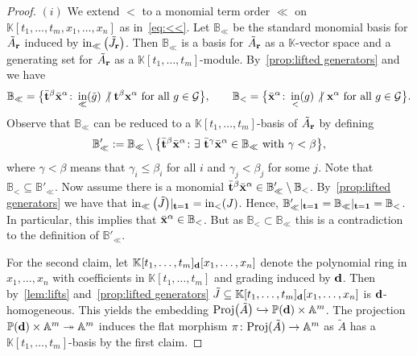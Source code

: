 \documentclass[10pt,a4paper]{amsart}
\newcommand{\thref}[1]{\ref{#1}}
\numberwithin{equation}{section}
\DeclareMathOperator{\init}{in}
\begin{document}
\begin{proof}
$(i)$ We extend $<$ to a monomial term order $\ll$ on $\mathbb K[t_1,\dots,t_m,x_1,\dots,x_n]$ as in~\eqref{eq:<<}.
 Let $\mathbb B_{\ll}$ be the standard monomial basis for $\tilde A_{\bf r}$ induced by $\init_{\ll}\big(\tilde J_{\bf r}\big)$.
 Then $\mathbb B_{\ll}$ is a basis for $\tilde A_{\bf r}$ as a $\mathbb{K}$-vector space and a generating set for $\tilde A_{\bf r}$ as a $\mathbb K[t_1,\dots,t_m]$-module.
 By~\thref{prop:lifted generators} and~\cite[Proposition 1.1.5]{herzog2011monomial} we have
 \begin{gather*}
 \mathbb B_{\ll} = \big\{\bar {\bf t}^\beta\bar {\bf x}^\alpha \colon \init_{\ll}(\tilde g)\not\vert \ {\bf t}^\beta{\bf x}^\alpha \text{ for all }g\in \mathcal G\big\},\qquad
 \mathbb B_{<} = \big\{\bar {\bf x}^\alpha \colon \init_{<}(g)\not\vert \ {\bf x}^\alpha \text{ for all }g\in \mathcal G\big\}.
 \end{gather*}
 Observe that $\mathbb B_{\ll}$ can be reduced to a $\mathbb K[t_1,\dots,t_m]$-basis of $\tilde A_{\bf r}$ by defining
 \begin{displaymath}
 \mathbb B'_{\ll}:= \mathbb B_{\ll} \setminus \big\{\bar{\bf t}^\beta\bar{\bf x}^\alpha \colon \exists \ \bar{\bf t}^{\gamma}\bar{\bf x}^\alpha\in \mathbb B_{\ll} \text{ with } \gamma < \beta\big\},
 \end{displaymath}
 where $\gamma < \beta$ means that $\gamma_i\le \beta_i$ for all $i$ and $\gamma_j<\beta_j$ for some $j$. Note that $\mathbb B_{<}\subseteq \mathbb B'_{\ll}$.
 Now assume there is a monomial $\bar{\bf t}^\beta\bar{\bf x}^\alpha \in \mathbb B'_{\ll}\setminus \mathbb B_<$.
 By~\thref{prop:lifted generators} we have that $\init_{\ll}\big(\tilde J\big)\vert_{{\bf t}={\bf 1}}=\init_<(J)$.
 Hence, $\mathbb B'_{\ll}\vert_{{\bf t}={\bf 1}}=\mathbb B_{\ll}\vert_{{\bf t}={\bf 1}}=\mathbb B_<$.
 In particular, this implies that $\bar{\bf x}^\alpha\in \mathbb B_<$. But as $\mathbb B_<\subset \mathbb B_{\ll}$ this is a contradiction to the definition of $\mathbb B'_{\ll}$.

 For the second claim, let $\mathbb K[t_1,\dots,t_m]_{\bf d}[x_1,\dots,x_n]$ denote the polynomial ring in $x_1,\dots,x_n$ with coefficients in $\mathbb K[t_1,\dots,t_m]$ and grading induced by ${\bf d}$.
 Then by~\thref{lem:lifts} and~\thref{prop:lifted generators} $\tilde J\subseteq \mathbb K[t_1,\dots,t_m]_{\bf d}[x_1,\dots,x_n]$ is ${\bf d}$-homogeneous.
 This yields the embedding ${\rm Proj}\big(\tilde A\big)\hookrightarrow \mathbb P({\bf d})\times \mathbb A^m$.
 The projection $\mathbb P({\bf d})\times \mathbb A^m\twoheadrightarrow \mathbb A^m$ induces the flat morphism $\pi\colon {\rm Proj}(\tilde A)\to \mathbb A^m$ as $\tilde A$ has a $\mathbb K[t_1,\dots,t_m]$-basis by the first claim.


\end{proof}
\end{document}
